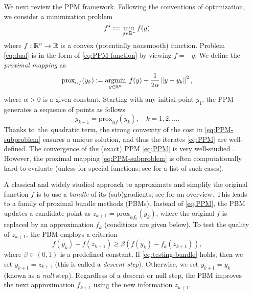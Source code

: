 \documentclass[11pt]{article}
\begin{document}
We next review the PPM framework. Following the conventions of optimization, we consider a minimization problem 
\begin{equation} \label{eq:PPM-function}
f^\star := \min_{y\in \mathbb{R}^n} f(y)
\end{equation}
where $f:\mathbb{R}^n \to \mathbb{R}$ is a convex (potentially nonsmooth) function. Problem \cref{eq:dual} is in the form of \cref{eq:PPM-function} by viewing $f=-g$. 
We define the \textit{proximal mapping} as
\begin{equation} \label{eq:PPM-subproblem}
    \text{prox}_{\alpha f}(y_k):=\operatorname*{\arg\!\min}_{y \in \mathbb{R}^n}\; f(y) + \frac{1}{2\alpha} \left\|y - y_k\right\|^2,
\end{equation}
where $\alpha > 0$ is a given constant.  
Starting with any initial point $y_1$, the PPM generates a sequence of points as follows
\begin{equation}
    \label{eq:PPM}
     y_{k+1} =   \mathrm{prox}_{\alpha f}(y_k), \quad k = 1, 2, \ldots.
\end{equation}
Thanks to~the~quadratic term, the strong convexity of the cost in \cref{eq:PPM-subproblem} ensures a unique solution, and thus the iterates \cref{eq:PPM} are well-defined. 
%
The convergence of the (exact) PPM \cref{eq:PPM} is very well-studied \cite{rockafellar1976monotone,luque1984asymptotic,leventhal2009metric}. However, the proximal mapping \cref{eq:PPM-subproblem} is often computationally hard to evaluate (unless for special functions; see \cite[Chapter 6]{beck2017first} for a list of such cases). 

A classical and widely studied approach to approximate and simplify the original function $f$ is to use a \textit{bundle} of its (sub)gradients; see \cite{lemarechal1994condensed} for an overview. This leads to a family of proximal bundle methods (PBMs). 
%
Instead of \cref{eq:PPM}, the PBM updates a candidate point as $z_{k+1} = \mathrm{prox}_{\alpha f_k}(y_k)$, where the original $f$ is replaced by an approximation $f_k$ (conditions are given below). To test the quality of $z_{k+1}$, the PBM employs a criterion
\begin{equation}
    \label{eq:testing-bundle}
    f(y_{k}) - f(z_{k+1}) \geq \beta(f(y_{k}) - f_{k}(z_{k+1})), 
\end{equation}
where $\beta \in (0,1)$ is a predefined constant. If \eqref{eq:testing-bundle} holds, then we set $ y_{k+1} = z_{k+1}$ (this is called a \emph{descent step}). Otherwise, we set $y_{k+1} = y_k$ (known as a \textit{null} step). Regardless of a descent or null step, the PBM improves the next approximation $f_{k+1}$ using the new information $z_{k+1}$. 
\end{document}
